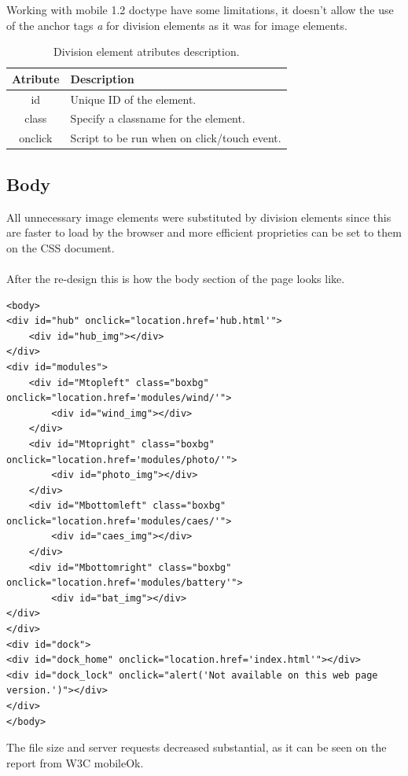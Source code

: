 Working with mobile 1.2 doctype have some limitations, it doesn't allow the use of the anchor tags \textit{a} for division elements as it was for image elements.

\begin{table}[h!]
\begin{tabular}{ | c | l | }
\hline
\textbf{Atribute} & \textbf{Description} \\ \hline
id & Unique ID of the element. \\ \hline
class &Specify a classname for the element. \\ \hline
onclick & Script to be run when on click/touch event. \\ \hline
\end{tabular}
\caption{Division element atributes description.}
\end{table}

\subsection{Body}

All unnecessary image elements were substituted by division elements since this are faster to load by the browser and more efficient proprieties can be set to them on the CSS document.\\
\\After the re-design this is how the body section of the page looks like.
\\
\begin{lstlisting}
<body>
<div id="hub" onclick="location.href='hub.html'">
	<div id="hub_img"></div>
</div>
<div id="modules">
	<div id="Mtopleft" class="boxbg" onclick="location.href='modules/wind/'">
		<div id="wind_img"></div>
	</div>
	<div id="Mtopright" class="boxbg" onclick="location.href='modules/photo/'">
		<div id="photo_img"></div>
	</div>
	<div id="Mbottomleft" class="boxbg" onclick="location.href='modules/caes/'">
		<div id="caes_img"></div>
	</div>
	<div id="Mbottomright" class="boxbg" onclick="location.href='modules/battery'">
		<div id="bat_img"></div>
</div>
</div>
<div id="dock">
<div id="dock_home" onclick="location.href='index.html'"></div>
<div id="dock_lock" onclick="alert('Not available on this web page version.')"></div>
</div>
</body>
\end{lstlisting}

The file size and server requests decreased substantial, as it can be seen on the report from W3C mobileOk.

